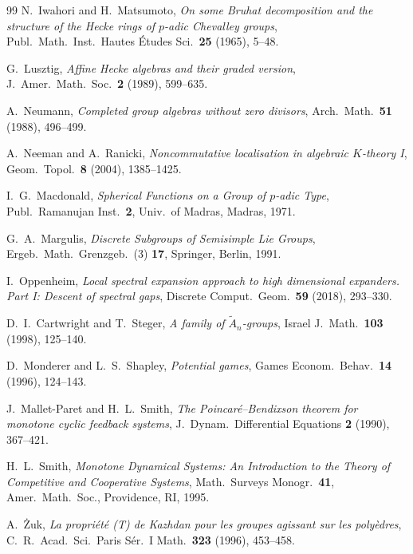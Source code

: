 \begin{thebibliography}{99}
 N.~Iwahori and H.~Matsumoto, \emph{On some Bruhat decomposition and the structure of the Hecke rings of $p$-adic Chevalley groups}, Publ.\ Math.\ Inst.\ Hautes \'Etudes Sci.\ \textbf{25} (1965), 5--48. 

 G.~Lusztig, \emph{Affine Hecke algebras and their graded version}, J.\ Amer.\ Math.\ Soc.\ \textbf{2} (1989), 599--635. 

 A.~Neumann, \emph{Completed group algebras without zero divisors}, Arch.\ Math.\ \textbf{51} (1988), 496--499. 

 A.~Neeman and A.~Ranicki, \emph{Noncommutative localisation in algebraic $K$-theory I}, Geom.\ Topol.\ \textbf{8} (2004), 1385--1425. 

 I.~G.~Macdonald, \emph{Spherical Functions on a Group of $p$-adic Type}, Publ.\ Ramanujan Inst.\ \textbf{2}, Univ.\ of Madras, Madras, 1971.

 G.~A.~Margulis, \emph{Discrete Subgroups of Semisimple Lie Groups}, Ergeb.\ Math.\ Grenzgeb.\ (3) \textbf{17}, Springer, Berlin, 1991. 

 I.~Oppenheim, \emph{Local spectral expansion approach to high dimensional expanders. Part I: Descent of spectral gaps}, Discrete Comput.\ Geom.\ \textbf{59} (2018), 293--330. 

 D.~I.~Cartwright and T.~Steger, \emph{A family of $\tilde A_n$-groups}, Israel J.\ Math.\ \textbf{103} (1998), 125--140. 

 D.~Monderer and L.~S.~Shapley, \emph{Potential games}, Games Econom.\ Behav.\ \textbf{14} (1996), 124--143. 

 J.~Mallet-Paret and H.~L.~Smith, \emph{The Poincar\'e--Bendixson theorem for monotone cyclic feedback systems}, J.\ Dynam.\ Differential Equations \textbf{2} (1990), 367--421. 

 H.~L.~Smith, \emph{Monotone Dynamical Systems: An Introduction to the Theory of Competitive and Cooperative Systems}, Math.\ Surveys Monogr.\ \textbf{41}, Amer.\ Math.\ Soc., Providence, RI, 1995. 

 A.~\.Zuk, \emph{La propri\'et\'e (T) de Kazhdan pour les groupes agissant sur les poly\`edres}, C.~R.\ Acad.\ Sci.\ Paris S\'er.\ I Math.\ \textbf{323} (1996), 453--458.
\end{thebibliography}
